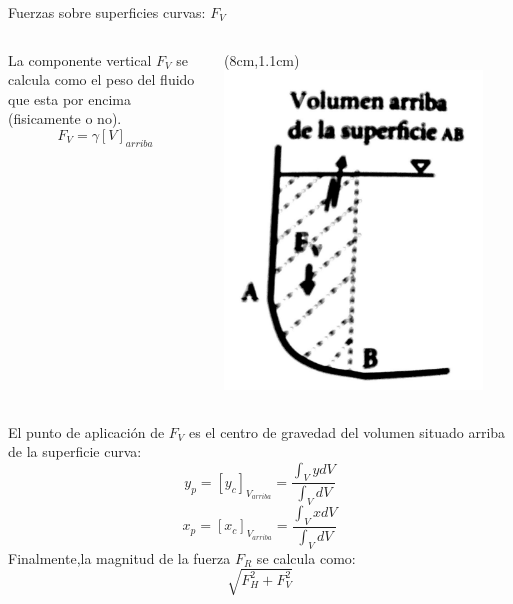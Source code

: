 \documentclass [xcolor=svgnames, t] {beamer}
\begin{document}
\begin{frame}{Fuerzas sobre superficies curvas: $F_V$}
\begin{columns}
La componente vertical $F_V$ se calcula como el peso del fluido que esta por encima (fisicamente o no). 
$$
F_V = \gamma [V]_{arriba}
$$
\begin{textblock*}{3cm}(8cm,1.1cm) %
\includegraphics[width=0.9\textwidth]{curb4}
\end{textblock*}
\end{columns}
\vspace{0.8cm}
El punto de aplicaci\'on de $F_V$ es el centro de gravedad del volumen situado arriba de la superficie curva:
$$
y_p = [y_c ]_{V_{arriba}} = \frac{\int_V y dV}{\int_V dV}
$$
$$
x_p = [x_c ]_{V_{arriba}}= \frac{\int_V x dV}{\int_V dV}
$$
Finalmente,la magnitud de la fuerza $F_R$ se calcula como:
$$
\sqrt{F_H^2 + F_V^2}
$$
\end{frame}

\end{document}

